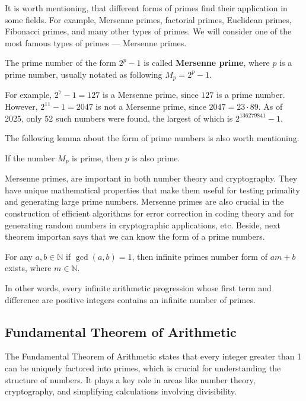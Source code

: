\documentclass[../lecture-notes-148x210.tex]{subfiles}
\begin{document}
It is worth mentioning, that different forms of primes find their application in some 
fields. For example, Mersenne primes, factorial primes, Euclidean primes, Fibonacci primes,
and many other types of primes. We will consider one of the most famous types of 
primes --- Mersenne primes.

\begin{definition} 
    The prime number of the form $2^p - 1$ is called \textbf{Mersenne prime}, where $p$ is a
    prime number, usually notated as following $M_p = 2^p - 1$.
\end{definition}

\begin{example}
    For example, $2^7 - 1 = 127$ is a Mersenne prime, since $127$ is a prime number.
    However, $2^{11} - 1 = 2047$ is not a Mersenne prime, since $2047 = 23 \cdot 89$. 
    As of 2025, only 52 such numbers were found, the largest of which is $2^{136279841} - 1$.
\end{example}

The following lemma about the form of prime numbers 
is also worth mentioning. 

\begin{lemma}
    If the number $M_p$ is prime, then $p$ is also prime.
\end{lemma}

Mersenne primes, are important in both number theory and cryptography.
They have unique mathematical properties that make them useful for testing primality and generating large prime numbers.
Mersenne primes are also crucial in the construction of efficient algorithms for error correction in coding theory and for generating random numbers in cryptographic applications, etc. 
Beside, next theorem importan says that we can know the form of a prime numbers.

\begin{theorem} 
    For any $a, b \in \mathbb{N}$ if $\gcd(a, b) = 1$, then infinite primes number form of $am + b$ exists, where $m \in \mathbb{N}$.
\end{theorem}

In other words, every infinite arithmetic progression whose first term and difference are positive integers contains an infinite number of primes.

\subsection{Fundamental Theorem of Arithmetic}
The Fundamental Theorem of Arithmetic states that every integer greater than 1 can be 
uniquely factored into primes, which is crucial for understanding the structure of numbers. 
It plays a key role in areas like number theory, cryptography, and simplifying 
calculations involving divisibility. 
\end{document}
